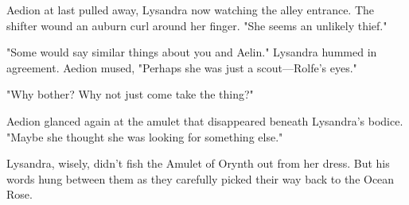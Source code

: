 Aedion at last pulled away, Lysandra now watching the alley entrance. The shifter wound an auburn curl around her finger. "She seems an unlikely thief."

"Some would say similar things about you and Aelin." Lysandra hummed in agreement. Aedion mused, "Perhaps she was just a scout---Rolfe's eyes."

"Why bother? Why not just come take the thing?"

Aedion glanced again at the amulet that disappeared beneath Lysandra's bodice. "Maybe she thought she was looking for something else."

Lysandra, wisely, didn't fish the Amulet of Orynth out from her dress. But his words hung between them as they carefully picked their way back to the Ocean Rose.
